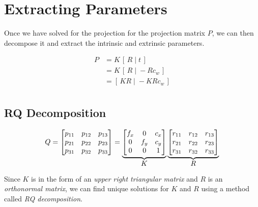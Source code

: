 \section{Extracting Parameters} \label{sec:extract}

Once we have solved for the projection for the projection matrix $P$, we can then decompose it and extract the intrinsic and extrinsic parameters. 

\begin{align}
    P & = K\,[\,R\;|\;t\,]       \nonumber \\
      & = K\,[\,R\;|\;-Rc_w\,]   \nonumber \\
      & = [\,KR\;|\;-KRc_w\,]              \\
\end{align}



\subsection{RQ Decomposition} \label{subsec:rq}

\begin{equation*}
    Q =
    \begin{bmatrix}
        p_{11} & p_{12} & p_{13} \\
        p_{21} & p_{22} & p_{23} \\
        p_{31} & p_{32} & p_{33}
    \end{bmatrix}
    =
    \underbrace{
        \begin{bmatrix}
            f_x & 0   & c_x \\
            0   & f_y & c_y \\
            0   & 0   & 1
        \end{bmatrix}
    }_{\mathlarger{K}}
    \underbrace{
        \begin{bmatrix}
            r_{11} & r_{12} & r_{13} \\
            r_{21} & r_{22} & r_{23} \\
            r_{31} & r_{32} & r_{33} \\
        \end{bmatrix}
    }_{\mathlarger{R}}
\end{equation*}

Since $K$ is in the form of an \emph{upper right triangular matrix} and $R$ is an \emph{orthonormal matrix}, we can find unique solutions for $K$ and $R$ using a method called \emph{RQ decomposition}.



